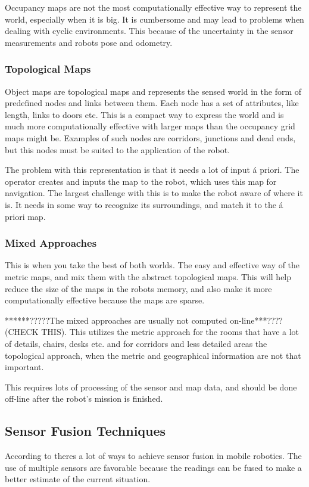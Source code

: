 Occupancy maps are not the most computationally effective way to represent the world,
especially when it is big. It is cumbersome and may lead to problems when dealing with
cyclic environments. This because of the uncertainty in the sensor measurements and robots
pose and odometry. 


\subsubsection{Topological Maps}
Object maps are topological maps and represents the sensed world in the form of predefined nodes and links
between them. Each node has a set of attributes, like length, links to doors etc. This is
a compact way to express the world and is much more computationally effective with larger
maps than the occupancy grid maps might be. Examples of such nodes are corridors,
junctions and dead ends, but this nodes must be suited to the application of the robot. 

The problem with this representation is that it needs a lot of input \'a priori. The
operator creates and inputs the map to the robot, which uses this map for navigation. The
largest challenge with this is to make the robot aware of where it is. It needs in some
way to recognize its surroundings, and match it to the \'a priori map.


\subsubsection{Mixed Approaches}
This is when you take the best of both worlds. The easy and effective way of the metric
maps, and mix them with the abstract topological maps. This will help reduce the size of
the maps in the robots memory, and also make it more computationally effective because the
maps are sparse. 

******?????The mixed approaches are usually not computed on-line***???? (CHECK THIS). This utilizes
the metric approach for the rooms that have a lot of details, chairs, desks etc. and for
corridors and less detailed areas the topological approach, when the metric and
geographical information are not that important. 

This requires lots of processing of the sensor and map data, and should be done off-line
after the robot's mission is finished. 


\subsection{Sensor Fusion Techniques}
According to \cite{sensor-fusion-mobile-robots} theres a lot of ways to achieve sensor
fusion in mobile robotics. The use of multiple sensors are favorable because the readings
can be fused to make a better estimate of the current situation. 

